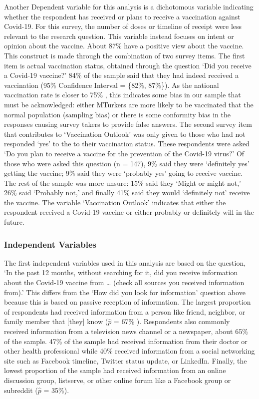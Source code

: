 Another Dependent variable for this analysis is a dichotomous variable
indicating whether the respondent has received or plans to receive a vaccination against Covid-19. For this survey, the number of doses or timeline of receipt were less
relevant to the research question. This variable instead focuses on intent or
opinion about the vaccine. About 87\% have a
positive view about the vaccine. This construct is made through the combination
of two survey items. The first item is actual vaccination status, obtained through
the question `Did you receive a Covid-19 vaccine?'
84\% of the sample said that
they had indeed received a vaccination (95\% Confidence Interval = \{82\%, 87\%\}). As the national vaccination rate is closer to 75\% \citep{cdc20}, this indicates some bias in our sample that must be
acknowledged: either MTurkers are more likely to be vaccinated that the normal
population (sampling bias) or there is some conformity bias in the responses
causing survey takers to provide false answers. The second survey item that
contributes to `Vaccination Outlook' was only given to those who had not
responded `yes' to the to their vaccination status. These respondents were asked `Do you
plan to receive a vaccine for the prevention of the Covid-19 virus?' Of those
who were asked this question (n = 147), 9\% said they were `definitely yes' getting the vaccine;
9\% said they were `probably yes' going to receive vaccine. The rest of the sample was more unsure: 15\% said they `Might or might not,' 26\% said `Probably not,' and finally 41\% said they would `definitely not' receive the vaccine. The variable `Vaccination Outlook' indicates that either the respondent received a Covid-19 vaccine or
either probably or definitely will in the future.

\hypertarget{independent-variables}{%
\subsubsection{Independent Variables}\label{independent-variables}}

The first independent variables used in this analysis are based on the question,
`In the past 12 months, without searching for it, did you receive information
about the Covid-19 vaccine from \ldots{} (check all sources you received information
from).' This differs from the `How did you look for information' question above
because this is based on passive reception of information. The largest proportion
of respondents had received information from a person like friend, neighbor, or
family member that {[}they{]} know (\(\widehat{p}\) = 67\%
). Respondents also commonly received information from a television news channel
or a newspaper, about 65\% of the sample.
47\% of the sample had received information from
their doctor or other health professional while 40\%
received information from a social networking site such as Facebook timeline,
Twitter status update, or LinkedIn. Finally, the lowest proportion of the sample
had received information from an online discussion group, listserve, or other
online forum like a Facebook group or subreddit
(\(\widehat{p}\) = 35\%).

